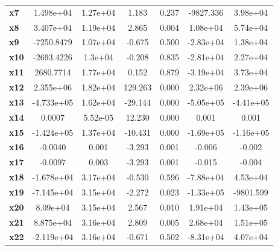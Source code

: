 \documentclass{article}
\begin{document}
\begin{center}
{\begin{tabular}{lcccccc}
\textbf{x7}    &    1.498e+04  &     1.27e+04     &     1.183  &         0.237        &    -9827.336    &     3.98e+04     \\
\textbf{x8}    &    3.407e+04  &     1.19e+04     &     2.865  &         0.004        &     1.08e+04    &     5.74e+04     \\
\textbf{x9}    &   -7250.8479  &     1.07e+04     &    -0.675  &         0.500        &    -2.83e+04    &     1.38e+04     \\
\textbf{x10}   &   -2693.4226  &      1.3e+04     &    -0.208  &         0.835        &    -2.81e+04    &     2.27e+04     \\
\textbf{x11}   &    2680.7714  &     1.77e+04     &     0.152  &         0.879        &    -3.19e+04    &     3.73e+04     \\
\textbf{x12}   &    2.355e+06  &     1.82e+04     &   129.263  &         0.000        &     2.32e+06    &     2.39e+06     \\
\textbf{x13}   &   -4.733e+05  &     1.62e+04     &   -29.144  &         0.000        &    -5.05e+05    &    -4.41e+05     \\
\textbf{x14}   &       0.0007  &     5.52e-05     &    12.230  &         0.000        &        0.001    &        0.001     \\
\textbf{x15}   &   -1.424e+05  &     1.37e+04     &   -10.431  &         0.000        &    -1.69e+05    &    -1.16e+05     \\
\textbf{x16}   &      -0.0040  &        0.001     &    -3.293  &         0.001        &       -0.006    &       -0.002     \\
\textbf{x17}   &      -0.0097  &        0.003     &    -3.293  &         0.001        &       -0.015    &       -0.004     \\
\textbf{x18}   &   -1.678e+04  &     3.17e+04     &    -0.530  &         0.596        &    -7.88e+04    &     4.53e+04     \\
\textbf{x19}   &   -7.145e+04  &     3.15e+04     &    -2.272  &         0.023        &    -1.33e+05    &    -9801.599     \\
\textbf{x20}   &     8.09e+04  &     3.15e+04     &     2.567  &         0.010        &     1.91e+04    &     1.43e+05     \\
\textbf{x21}   &    8.875e+04  &     3.16e+04     &     2.809  &         0.005        &     2.68e+04    &     1.51e+05     \\
\textbf{x22}   &   -2.119e+04  &     3.16e+04     &    -0.671  &         0.502        &    -8.31e+04    &     4.07e+04     \\

\end{tabular}}
\end{center}
\end{document}
